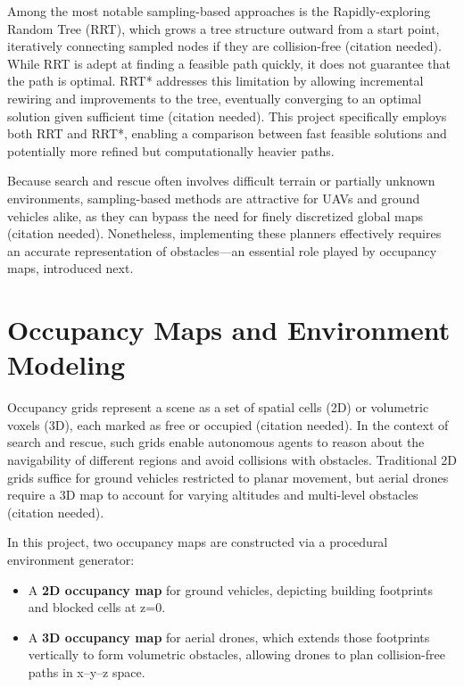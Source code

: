 \documentclass[12pt,a4paper]{report}
\begin{document}
Among the most notable sampling-based approaches is the Rapidly-exploring Random Tree (RRT), which 
grows a tree structure outward from a start point, iteratively connecting sampled nodes if they are 
collision-free (citation needed). While RRT is adept at finding a feasible path quickly, it does not 
guarantee that the path is optimal. RRT* addresses this limitation by allowing incremental rewiring 
and improvements to the tree, eventually converging to an optimal solution given sufficient time 
(citation needed). This project specifically employs both RRT and RRT*, enabling a comparison between 
fast feasible solutions and potentially more refined but computationally heavier paths. 

Because search and rescue often involves difficult terrain or partially unknown environments, 
sampling-based methods are attractive for UAVs and ground vehicles alike, as they can bypass 
the need for finely discretized global maps (citation needed). Nonetheless, implementing these 
planners effectively requires an accurate representation of obstacles—an essential role played by 
occupancy maps, introduced next.

\section{Occupancy Maps and Environment Modeling}
\label{sec:occ_maps_env_modeling}
Occupancy grids represent a scene as a set of spatial cells (2D) or volumetric voxels (3D), each 
marked as free or occupied (citation needed). In the context of search and rescue, such grids 
enable autonomous agents to reason about the navigability of different regions and avoid collisions 
with obstacles. Traditional 2D grids suffice for ground vehicles restricted to planar movement, but 
aerial drones require a 3D map to account for varying altitudes and multi-level obstacles 
(citation needed).

In this project, two occupancy maps are constructed via a procedural environment generator:  
\begin{itemize}
    \item A \textbf{2D occupancy map} for ground vehicles, depicting building footprints and 
          blocked cells at z=0.  
    \item A \textbf{3D occupancy map} for aerial drones, which extends those footprints vertically 
          to form volumetric obstacles, allowing drones to plan collision-free paths in x–y–z space.
\end{itemize}
\end{document}
